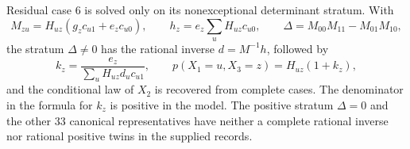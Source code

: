 Residual case \(6\) is solved only on its nonexceptional determinant stratum. With
\[
M_{zu}=H_{uz}(g_zc_{u1}+e_zc_{u0}),\qquad
h_z=e_z\sum_uH_{uz}c_{u0},\qquad
\Delta=M_{00}M_{11}-M_{01}M_{10},
\]
the stratum \(\Delta\ne0\) has the rational inverse \(d=M^{-1}h\), followed by
\[
k_z=\frac{e_z}{\sum_uH_{uz}d_uc_{u1}},\qquad
p(X_1=u,X_3=z)=H_{uz}(1+k_z),
\]
and the conditional law of \(X_2\) is recovered from complete cases. The denominator in the formula for \(k_z\) is positive in the model. The positive stratum \(\Delta=0\) and the other \(33\) canonical representatives have neither a complete rational inverse nor rational positive twins in the supplied records.